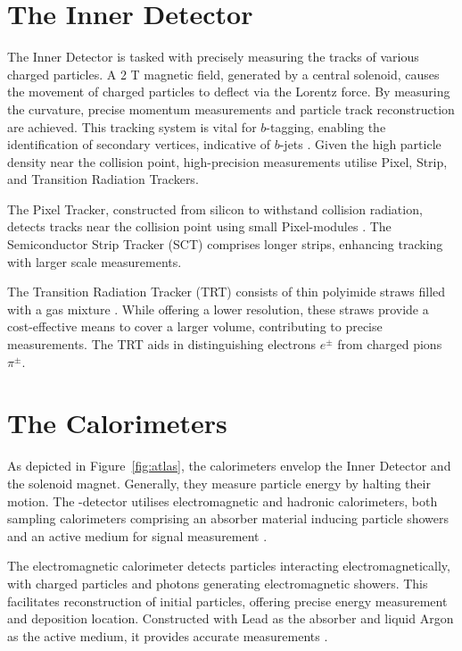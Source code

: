 \section*{The Inner Detector}
The Inner Detector is tasked with precisely measuring the tracks of various charged particles. A 2 T magnetic field, generated by a central solenoid, causes the movement of charged particles to deflect via the Lorentz force. By measuring the curvature, precise momentum measurements and particle track reconstruction are achieved. This tracking system is vital for $b$-tagging, enabling the identification of secondary vertices, indicative of $b$-jets \cite{atlas}. Given the high particle density near the collision point, high-precision measurements utilise Pixel, Strip, and Transition Radiation Trackers.

The Pixel Tracker, constructed from silicon to withstand collision radiation, detects tracks near the collision point using small Pixel-modules \cite{atlas}. The Semiconductor Strip Tracker (SCT) comprises longer strips, enhancing tracking with larger scale measurements.

The Transition Radiation Tracker (TRT) consists of thin polyimide straws filled with a gas mixture \cite{atlas}. While offering a lower resolution, these straws provide a cost-effective means to cover a larger volume, contributing to precise measurements. The TRT aids in distinguishing electrons $e^\pm$ from charged pions $\pi^\pm$.

\section*{The Calorimeters}
As depicted in Figure~\ref{fig:atlas}, the calorimeters envelop the Inner Detector and the solenoid magnet. Generally, they measure particle energy by halting their motion. The \atlas-detector utilises electromagnetic and hadronic calorimeters, both sampling calorimeters comprising an absorber material inducing particle showers and an active medium for signal measurement \cite{atlas_calorimeter}.

The electromagnetic calorimeter detects particles interacting electromagnetically, with charged particles and photons generating electromagnetic showers. This facilitates reconstruction of initial particles, offering precise energy measurement and deposition location. Constructed with Lead as the absorber and liquid Argon as the active medium, it provides accurate measurements \cite{atlas_calorimeter}.

